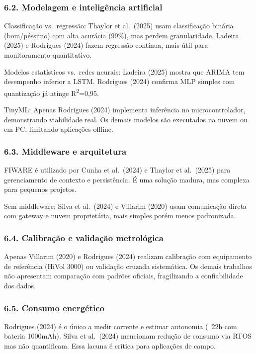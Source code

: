 \documentclass[12pt,a4paper]{article}
\begin{document}
\subsubsection*{6.2. Modelagem e inteligência artificial}

Classificação vs.\ regressão: Thaylor et al.\ (2025) usam classificação binária (bom/péssimo) com alta acurácia (99\%), mas perdem granularidade. Ladeira (2025) e Rodrigues (2024) fazem regressão contínua, mais útil para monitoramento quantitativo.

Modelos estatísticos vs.\ redes neurais: Ladeira (2025) mostra que ARIMA tem desempenho inferior a LSTM. Rodrigues (2024) confirma MLP simples com quantização já atinge R\textsuperscript{2}=0,95.

TinyML: Apenas Rodrigues (2024) implementa inferência no microcontrolador, demonstrando viabilidade real. Os demais modelos são executados na nuvem ou em PC, limitando aplicações offline.

\subsubsection*{6.3. Middleware e arquitetura}

FIWARE é utilizado por Cunha et al.\ (2024) e Thaylor et al.\ (2025) para gerenciamento de contexto e persistência. É uma solução madura, mas complexa para pequenos projetos.

Sem middleware: Silva et al.\ (2024) e Villarim (2020) usam comunicação direta com gateway e nuvem proprietária, mais simples porém menos padronizada.

\subsubsection*{6.4. Calibração e validação metrológica}

Apenas Villarim (2020) e Rodrigues (2024) realizam calibração com equipamento de referência (HiVol 3000) ou validação cruzada sistemática. Os demais trabalhos não apresentam comparação com padrões oficiais, fragilizando a confiabilidade dos dados.

\subsubsection*{6.5. Consumo energético}

Rodrigues (2024) é o único a medir corrente e estimar autonomia (~22h com bateria 1000mAh). Silva et al.\ (2024) mencionam redução de consumo via RTOS mas não quantificam. Essa lacuna é crítica para aplicações de campo.
\end{document}
